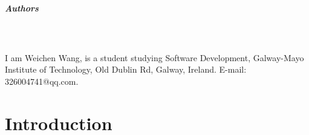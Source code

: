 \paragraph{Authors}
\\ \\ I am Weichen Wang, is a student studying Software Development, Galway-Mayo Institute of Technology, Old Dublin Rd, Galway, Ireland. E-mail: 326004741@qq.com.



\chapter{Introduction}

